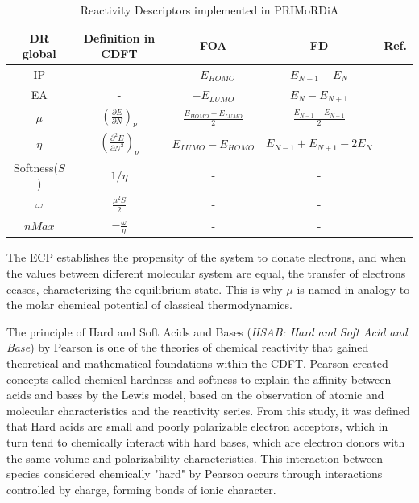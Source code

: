 \documentclass[a4paper,11pt]{refart}
\begin{document}
	\hspace*{-\leftmarginwidth}
	\begin{minipage}{\fullwidth}
		\begin{table}[H]
			\centering	
			\caption{Reactivity Descriptors implemented in PRIMoRDiA}
			\begin{tabular}{c|c|c|c|c}
				\toprule
				DR global & Definition in CDFT  & FOA & FD & Ref. \\
				\midrule
				IP & - & $- E_{HOMO}$ & $E_{N-1}-E_{N}$ & \\  \hline	
				EA & - & $- E_{LUMO}$ & $E_{N}-E_{N+1}$ & \\ \hline	
				$\mu$  & $\left(\frac{\partial E}{\partial N} \right)_\nu$  & $\frac{E_{HOMO} + E_{LUMO}}{2}$ &$\frac{E_{N-1}-E_{N+1}}{2}$ & \cite{ribeiro2017atlas}\\ \hline			
				$\eta$  & $\left(\frac{\partial ^2  E}{\partial N ^2} \right)_\nu$ &$E_{LUMO} - E_{HOMO}$ &$E_{N-1}+E_{N+1}-2E_{N}$ & \cite{parr1983absolute}\\ \hline
				Softness($S$)  & $1/\eta$  & - & -  & \cite{parr1983absolute} \\ \hline
				$\omega$  & $\frac{\mu^2S}{2}$  &-  &-  & \cite{cedillo2012local} \\ \hline
				$nMax$  & $-\frac{\omega}{\eta} $ & - & - & \cite{cedillo2012local}  \\ 
				\bottomrule
			\end{tabular} 
			\label{tab1}	
		\end{table}	
	\end{minipage}

	The ECP establishes the propensity of the system to donate electrons, and when the values between different molecular system are equal, the transfer of electrons ceases, characterizing the equilibrium state\cite{parr1983absolute}. This is why $\mu$ is named in analogy to the molar chemical potential of classical thermodynamics.

	The principle of Hard and Soft Acids and Bases (\textit{HSAB: Hard and Soft Acid and Base}) by Pearson\cite{pearson1987recent} is one of the theories of chemical reactivity that gained theoretical and mathematical foundations within the CDFT. Pearson created concepts called chemical hardness and softness to explain the affinity between acids and bases by the Lewis model, based on the observation of atomic and molecular characteristics and the reactivity series\cite{Pearson1963}. From this study, it was defined that Hard acids are small and poorly polarizable electron acceptors, which in turn tend to chemically interact with hard bases, which are electron donors with the same volume and polarizability characteristics. This interaction between species considered chemically "hard" by Pearson occurs through interactions controlled by charge, forming bonds of ionic character.
\end{document}
